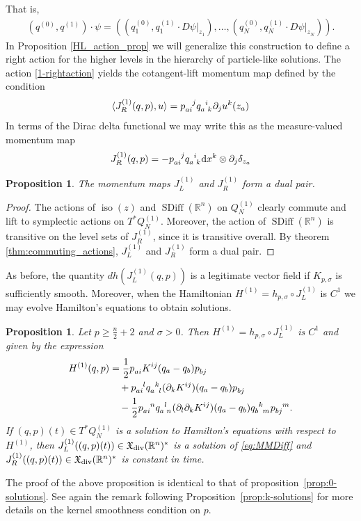 \documentclass[12pt]{amsart}
\newcommand{\R}{\ensuremath{\mathbb{R}}}
\newcommand{\dx}{\ensuremath{\textrm{d}x}}
\newtheorem{prop}[thm]{Proposition}
\DeclareMathOperator{\SDiff}{SDiff}
\DeclareMathOperator{\iso}{iso}
\begin{document}
	 That is, 
 \begin{align}
	 (q^{(0)}, q^{(1)}) \cdot \psi = \left( \left(q_1^{(0)}, q_1^{(1)} \cdot D\psi|_{z_1}\right), \ldots, \left(q_N^{(0)}, q_N^{(1)} \cdot D\psi|_{z_N}\right)\right). \label{1-rightaction}
\end{align}
In Proposition \ref{HL_action_prop} we will generalize this construction to define a right action for the higher levels in the hierarchy of particle-like solutions.
  The action \eqref{1-rightaction} yields the cotangent-lift momentum map defined by the condition
  \begin{align*}
    \langle J_R^{(1)}(q,p) , u \rangle = p\indices{_a_i^j} q\indices{_a^i_k} \partial_j u^k(z_a)
  \end{align*}
  In terms of the Dirac delta functional we may write this as the measure-valued momentum map
  \begin{align*}
    J_R^{(1)}(q,p) = - p\indices{_a_i^j} q\indices{_a^i_k} \dx^k \otimes \partial_j \delta_{z_a}
  \end{align*}
  \begin{prop}
    The momentum maps $J_L^{(1)}$ and $J_R^{(1)}$ form a dual pair.
  \end{prop}
  \begin{proof}
    The actions of $\iso(z)$ and $\SDiff(\R^n)$ on $Q_N^{(1)}$
    clearly commute
    and lift to symplectic actions on $T^*Q_N^{(1)}$.
    Moreover, the action of $\SDiff(\R^n)$ is transitive on the level sets of $J_R^{(1)}$, since it is transitive overall.
    By theorem \ref{thm:commuting_actions}, $J_L^{(1)}$ and $J_R^{(1)}$ form a dual pair.
  \end{proof}

  As before, the quantity $dh( J_L^{(1)}(q,p))$ is a legitimate vector field
  if $K_{p,\sigma}$ is sufficiently smooth.  Moreover, when the Hamiltonian
  $H^{(1)} = h_{p,\sigma} \circ J_L^{(1)}$ is $C^1$ we may evolve Hamilton's equations
  to obtain solutions.

  \begin{prop} \label{prop:1-solutions}
    Let $p \ge \frac{n}{2} + 2$ and $\sigma > 0$.
    Then $H^{(1)} = h_{p,\sigma} \circ J_L^{(1)}$ is $C^1$ and given by the expression
	\begin{align*}
		H^{(1)}(q,p) &= \frac{1}{2} p\indices{_a_i} K^{ij}(q_a - q_b) p\indices{_b_j}\\
			&\quad + p\indices{_a_i^l} q\indices{_a^k_l} (\partial_k K^{ij})(q_a - q_b) p\indices{_b_j} \\
			&\quad -  \frac{1}{2} p\indices{_a_i^n} q\indices{_a^l_n} (\partial_l \partial_k K^{ij})(q_a - q_b) q\indices{_b^k_m} p\indices{_b_j^m}.
  \end{align*}
  If $(q,p)(t) \in T^*Q_N^{(1)}$ is a solution to Hamilton's equations with respect to
	$H^{(1)}$, then $J_L^{(1)}( (q,p)(t)) \in \mathfrak{X}_{\rm div}(\R^n)^*$ is
	a solution of \eqref{eq:MMDiff} and $J_R^{(1)}( (q,p)(t)) \in \mathfrak{X}_{\rm div}(\R^n)^*$ is
	constant in time. 
  \end{prop}
  The proof of the above proposition is identical to that of
  proposition~\ref{prop:0-solutions}. See again the remark following
  Proposition~\ref{prop:k-solutions} for more details on the kernel
  smoothness condition on $p$.
\end{document}
